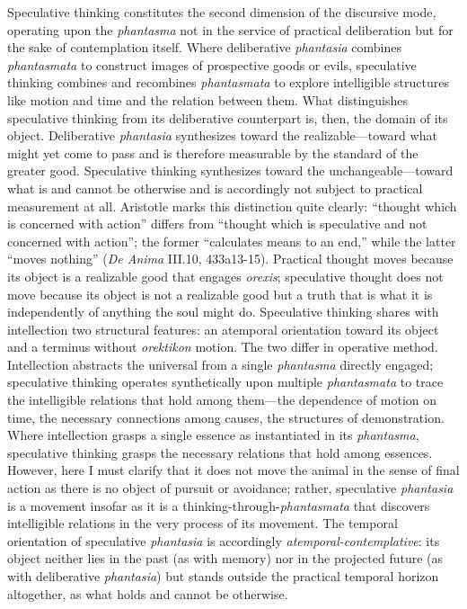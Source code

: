 \documentclass{article}
\begin{document}
Speculative thinking constitutes the second dimension of the discursive mode, operating upon the \textit{phantasma} not in the service of practical deliberation but for the sake of contemplation itself. Where deliberative \textit{phantasia} combines \textit{phantasmata} to construct images of prospective goods or evils, speculative thinking combines and recombines \textit{phantasmata} to explore intelligible structures like motion and time and the relation between them. What distinguishes speculative thinking from its deliberative counterpart is, then, the domain of its object. Deliberative \textit{phantasia} synthesizes toward the realizable---toward what might yet come to pass and is therefore measurable by the standard of the greater good. Speculative thinking synthesizes toward the unchangeable---toward what is and cannot be otherwise and is accordingly not subject to practical measurement at all. Aristotle marks this distinction quite clearly: ``thought which is concerned with action'' differs from ``thought which is speculative and not concerned with action''; the former ``calculates means to an end,'' while the latter ``moves nothing'' (\textit{De Anima} III.10, 433a13-15). Practical thought moves because its object is a realizable good that engages \textit{orexis}; speculative thought does not move because its object is not a realizable good but a truth that is what it is independently of anything the soul might do. Speculative thinking shares with intellection two structural features: an atemporal orientation toward its object and a terminus without \textit{orektikon} motion. The two differ in operative method. Intellection abstracts the universal from a single \textit{phantasma} directly engaged; speculative thinking operates synthetically upon multiple \textit{phantasmata} to trace the intelligible relations that hold among them---the dependence of motion on time, the necessary connections among causes, the structures of demonstration. Where intellection grasps a single essence as instantiated in its \textit{phantasma}, speculative thinking grasps the necessary relations that hold among essences. However, here I must clarify that it does not move the animal in the sense of final action as there is no object of pursuit or avoidance; rather, speculative \textit{phantasia} is a movement insofar as it is a thinking-through-\textit{phantasmata} that discovers intelligible relations in the very process of its movement. The temporal orientation of speculative \textit{phantasia} is accordingly \textit{atemporal-contemplative}: its object neither lies in the past (as with memory) nor in the projected future (as with deliberative \textit{phantasia}) but stands outside the practical temporal horizon altogether, as what holds and cannot be otherwise. 
\end{document}
